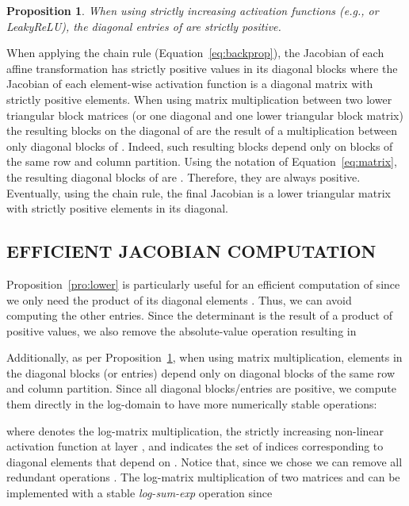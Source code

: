 \documentclass[letterpaper]{article}
\newtheorem{proposition}{Proposition}
\begin{document}
\begin{proposition} \label{pro:positive}
When using strictly increasing activation functions (e.g.,  or LeakyReLU), the diagonal entries of  are strictly positive.
\end{proposition}
\begin{proofsketch}
When applying the chain rule (Equation~\ref{eq:backprop}), the Jacobian of each affine transformation has strictly positive values in its diagonal blocks where the Jacobian of each element-wise activation function is a diagonal matrix with strictly positive elements. When using matrix multiplication between two lower triangular block matrices (or one diagonal and one lower triangular block matrix)  the resulting blocks on the diagonal of  are the result of a multiplication between only diagonal blocks of . Indeed, such resulting blocks depend only on blocks of the same row and column partition. Using the notation of Equation~\ref{eq:matrix}, the resulting diagonal blocks of  are . Therefore, they are always positive. Eventually, using the chain rule, the final Jacobian is a lower triangular matrix with strictly positive elements in its diagonal.
\end{proofsketch}

\subsection{EFFICIENT JACOBIAN COMPUTATION} \label{sec:bnaf_jacobian}
Proposition~\ref{pro:lower} is particularly useful for an efficient computation of  since we only need the product of its diagonal elements . Thus, we can avoid computing the other entries. Since the determinant is the result of a product of positive values, we also remove the absolute-value operation resulting in 

Additionally, as per Proposition~\ref{pro:positive}, when using matrix multiplication, elements in the diagonal blocks (or entries) depend only on diagonal blocks of the same row and column partition. Since all diagonal blocks/entries are positive, we compute them directly in the log-domain to have more numerically stable operations:

where  denotes the log-matrix multiplication,  the strictly increasing non-linear activation function at layer , and  indicates the set of indices corresponding to diagonal elements that depend on . Notice that, since we chose  we can remove all redundant operations . The log-matrix multiplication  of two matrices  and  can be implemented with a stable \emph{log-sum-exp} operation since
\end{document}
